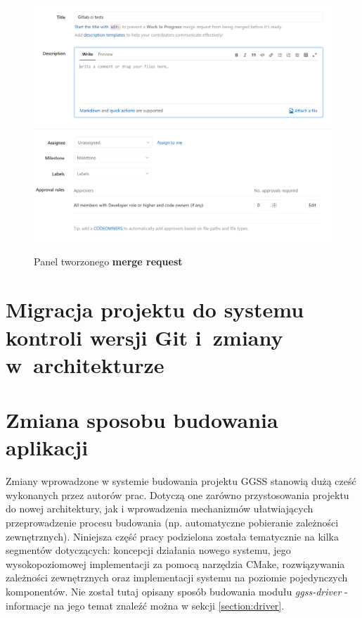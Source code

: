 \begin{figure}
\centering
\caption{Panel tworzonego \textbf{merge request}}
\includegraphics[width=\textwidth]{res/png/panelMergeRequest}
\label{fig:mergeRequestPanel}
\end{figure}

\newpage

\section{Migracja projektu do systemu kontroli wersji Git i~zmiany w~architekturze}

\newpage

\section{Zmiana sposobu budowania aplikacji}
Zmiany wprowadzone w systemie budowania projektu GGSS stanowią dużą cześć wykonanych przez autorów prac. Dotyczą one zarówno przystosowania projektu do nowej architektury, jak i wprowadzenia mechanizmów ułatwiających przeprowadzenie procesu budowania (np. automatyczne pobieranie zależności zewnętrznych). Niniejsza część pracy podzielona została tematycznie na kilka segmentów dotyczących: koncepcji działania nowego systemu, jego wysokopoziomowej implementacji za pomocą narzędzia CMake, rozwiązywania zależności zewnętrznych oraz implementacji systemu na poziomie pojedynczych komponentów. Nie został tutaj opisany sposób budowania modułu \textit{ggss-driver} - informacje na jego temat znaleźć można w sekcji \ref{section:driver}.

